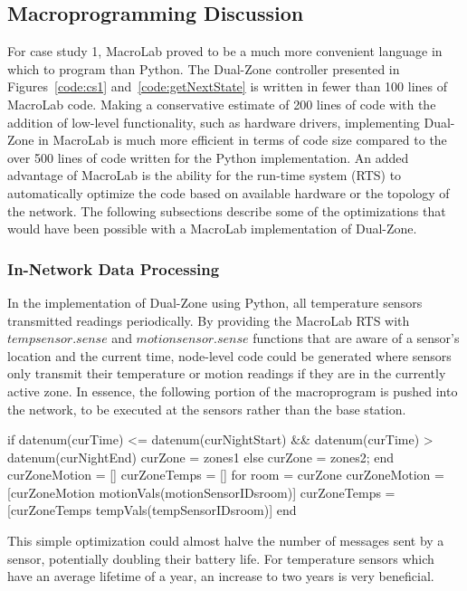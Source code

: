 \subsection{Macroprogramming Discussion}
\label{sec:cs1macroprogrammingDiscussion}

For case study 1, MacroLab proved to be a much more convenient language in which
to program than Python. The Dual-Zone controller presented in
Figures~\ref{code:cs1} and~\ref{code:getNextState} is written in fewer than 100
lines of MacroLab code. Making a conservative estimate of 200 lines of code with
the addition of low-level functionality, such as hardware drivers, implementing
Dual-Zone in MacroLab is much more efficient in terms of code size
compared to the over 500 lines of code written for the Python implementation. An
added advantage of MacroLab is the ability for the run-time system (RTS) to
automatically optimize the code based on available hardware or the topology of
the network. The following subsections describe some of the optimizations that
would have been possible with a MacroLab implementation of Dual-Zone.

\subsubsection{In-Network Data Processing}
In the implementation of Dual-Zone using Python, all temperature sensors
transmitted readings periodically. By providing the MacroLab RTS with
$tempsensor.sense$ and $motionsensor.sense$ functions that are aware of a
sensor's location and the current time, node-level code could be generated where
sensors only transmit their temperature or motion readings if they are in the
currently active zone. In essence, the following portion of the macroprogram is
pushed into the network, to be executed at the sensors rather than the base
station.

\begin{macrolab}
if datenum(curTime) <= datenum(curNightStart) && datenum(curTime) > datenum(curNightEnd)  
  curZone = zones{1}
else
  curZone = zones{2};
end
curZoneMotion = []
curZoneTemps = []
for room = curZone
  curZoneMotion = [curZoneMotion motionVals(motionSensorIDs{room})]
  curZoneTemps = [curZoneTemps tempVals(tempSensorIDs{room})]
end
\end{macrolab}

This simple optimization could almost halve the number of
messages sent by a sensor, potentially doubling their battery life. For
temperature sensors which have an average lifetime of a year, an increase
to two years is very beneficial. 

